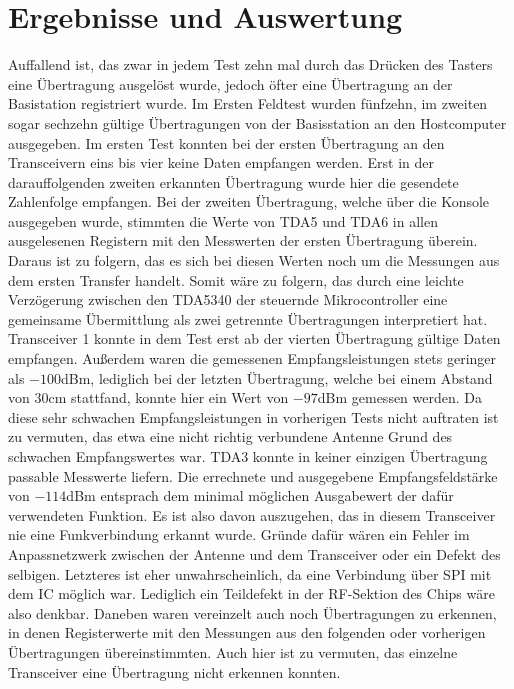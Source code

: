 \section{Ergebnisse und Auswertung}
Auffallend ist, das zwar in jedem Test zehn mal durch das Drücken des Tasters eine Übertragung ausgelöst wurde, jedoch öfter eine Übertragung an der Basistation registriert wurde. Im Ersten Feldtest wurden fünfzehn, im zweiten sogar sechzehn gültige Übertragungen von der Basisstation an den Hostcomputer ausgegeben. 
Im ersten Test konnten bei der ersten Übertragung an den Transceivern eins bis vier keine Daten empfangen  werden. Erst in der darauffolgenden zweiten erkannten Übertragung wurde hier die gesendete Zahlenfolge empfangen. Bei der zweiten Übertragung, welche über die Konsole ausgegeben wurde, stimmten die Werte von TDA5 und TDA6 in allen ausgelesenen Registern mit den Messwerten der ersten Übertragung überein.  Daraus ist zu folgern, das es sich bei diesen Werten noch um die Messungen aus dem ersten Transfer handelt. Somit wäre zu folgern, das durch eine leichte Verzögerung zwischen den TDA5340 der steuernde Mikrocontroller eine gemeinsame Übermittlung als zwei getrennte Übertragungen interpretiert hat.
Transceiver 1 konnte in dem Test erst ab der vierten Übertragung gültige Daten empfangen. Außerdem waren die gemessenen Empfangsleistungen stets geringer als $-100$dBm, lediglich  bei der letzten Übertragung, welche bei einem Abstand von $30$cm stattfand, konnte hier ein Wert von $-97$dBm gemessen werden. Da diese  sehr schwachen Empfangsleistungen in vorherigen Tests nicht auftraten ist zu vermuten, das etwa eine nicht richtig verbundene Antenne  Grund des schwachen Empfangswertes war.
TDA3 konnte in keiner einzigen Übertragung passable Messwerte liefern. Die errechnete und ausgegebene Empfangsfeldstärke von $-114$dBm entsprach dem minimal möglichen Ausgabewert der dafür verwendeten Funktion. Es ist also davon auszugehen, das in diesem Transceiver nie eine Funkverbindung erkannt wurde. Gründe dafür wären ein Fehler im Anpassnetzwerk zwischen der Antenne und dem Transceiver oder ein Defekt des selbigen. Letzteres ist eher unwahrscheinlich, da eine Verbindung über \ac{SPI} mit dem \ac{IC} möglich war. Lediglich ein Teildefekt  in der RF-Sektion des Chips wäre also denkbar.
Daneben waren vereinzelt auch noch Übertragungen zu erkennen, in denen Registerwerte mit den Messungen aus den folgenden oder vorherigen Übertragungen übereinstimmten. Auch hier ist zu vermuten, das einzelne Transceiver eine Übertragung nicht erkennen konnten.
